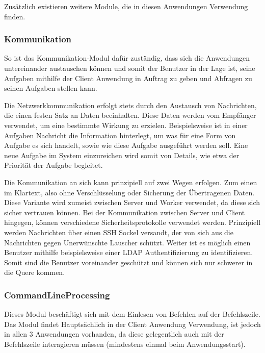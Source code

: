 \documentclass[a4paper,12pt]{article}
\begin{document}
Zusätzlich existieren weitere Module, die in diesen Anwendungen Verwendung finden. 

\subsubsection{Kommunikation}

So ist das Kommunikation-Modul dafür zuständig, dass sich die Anwendungen untereinander austauschen können und somit der Benutzer in der Lage ist, seine Aufgaben mithilfe der Client Anwendung in Auftrag zu geben und Abfragen zu seinen Aufgaben stellen kann.\newline


Die Netzwerkkommunikation erfolgt stets durch den Austausch von Nachrichten, die einen festen Satz an Daten beeinhalten. Diese Daten werden vom Empfänger verwendet, um eine bestimmte Wirkung zu erzielen. Beispielsweise ist in einer Aufgaben Nachricht die Information hinterlegt, um was für eine Form von Aufgabe es sich handelt, sowie wie diese Aufgabe ausgeführt werden soll. Eine neue Aufgabe im System einzureichen wird somit von Details, wie etwa der Priorität der Aufgabe begleitet.
\newline


Die Kommunikation an sich kann prinzipiell auf zwei Wegen erfolgen. Zum einen im Klartext, also ohne Verschlüsselung oder Sicherung der Übertragenen Daten. Diese Variante wird zumeist zwischen Server und Worker verwendet, da diese sich sicher vertrauen können. Bei der Kommunikation zwischen Server und Client hingegen, können verschiedene Sicherheitsprotokolle verwendet werden. Prinzipiell werden Nachrichten über einen SSH Sockel versandt, der von sich aus die Nachrichten gegen Unerwünschte Lauscher schützt. Weiter ist es möglich einen Benutzer mithilfe beispielsweise einer LDAP Authentifizierung zu identifizieren. Somit sind die Benutzer voreinander geschützt und können sich nur schwerer in die Quere kommen.
\clearpage
\subsubsection{CommandLineProcessing}

Dieses Modul beschäftigt sich mit dem Einlesen von Befehlen auf der Befehlszeile. Das Modul findet Hauptsächlich in der Client Anwendung Verwendung, ist jedoch in allen 3 Anwendungen vorhanden, da diese gelegentlich auch mit der Befehlszeile interagieren müssen (mindestens einmal beim Anwendungsstart).\\ 
\end{document}
